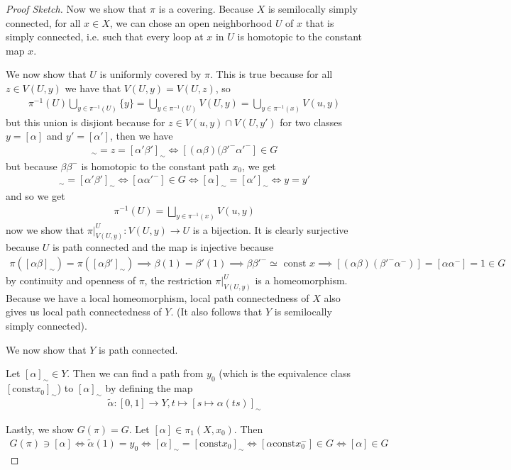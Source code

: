 \begin{proof}[Proof Sketch]
  Now we show that $\pi$ is a covering.
  Because $X$ is semilocally simply connected, for all $x \in X$, we can chose an open neighborhood $U$ of $x$ that is simply connected, i.e. such that every loop at $x$ in $U$ is homotopic to the constant map $x$.

  We now show that $U$ is uniformly covered by $\pi$.
  This is true because for all $z \in V(U,y)$ we have that $V(U,y) = V(U,z)$, so 
  \begin{align*}
    \pi^{-1}(U) \bigcup_{y \in \pi^{-1}(U)} \{y\} = \bigcup_{y \in \pi^{-1}(U)} V(U,y) = \bigcup_{y \in \pi^{-1}(x)}V(u,y)
  \end{align*}
  but this union is disjiont because for $z \in V(u,y) \cap V(U,y')$ for two classes $y = [\alpha]$ and $y' = [\alpha']$, then we have
  \begin{align*}
    [\alpha \beta]_{\sim} = z = [\alpha' \beta']_{\sim} \iff [(\alpha \beta)({\beta'}^{-}{\alpha'}^{-}] \in G
  \end{align*}
  but because $\beta \beta^{-}$ is homotopic to the constant path $x_0$, we get 
  \begin{align*}
    [\alpha \beta]_{\sim} = [\alpha' \beta']_{\sim} \iff [\alpha {\alpha'}^{-}] \in G \iff [\alpha]_{\sim} = [\alpha']_{\sim} \iff y = y'
  \end{align*}
  and so we get
  \begin{align*}
    \pi^{-1}(U) = \bigsqcup_{y \in \pi^{-1}(x)}V(u,y)
  \end{align*}
  now we show that $\pi|_{V(U,y)}^{U}: V(U,y) \to  U$ is a bijection.
  It is clearly surjective because $U$ is path connected and the map is injective because 
  \begin{align*}
    \pi([\alpha \beta]_{\sim}) = \pi([\alpha \beta']_{\sim}) \implies \beta(1) = \beta'(1) \implies \beta {\beta'}^{-} \simeq \text{ const }x \implies [(\alpha \beta)({\beta'}^{-} \alpha^{-})] = [\alpha \alpha^{-}] = 1 \in G
  \end{align*}
  by continuity and openness of $\pi$, the restriction $\pi|_{V(U,y)}^{U}$ is a homeomorphism.
  Because we have a local homeomorphism, local path connectedness of $X$ also gives us local path connectedness of $Y$. 
  (It also follows that $Y$ is semilocally simply connected).

  We now show that $Y$ is path connected.

  Let $[\alpha]_\sim \in Y$. Then we can find a path from $y_0$ (which is the equivalence class $[\text{const} x_0]_{\sim}$) to $[\alpha]_{\sim}$ by defining the map
  \begin{align*}
    \tilde{\alpha}:[0,1] \to  Y, t \mapsto  [s \mapsto  \alpha(ts)]_{\sim}
  \end{align*}

  Lastly, we show $G(\pi) = G$.
  Let $[\alpha] \in \pi_1(X,x_0)$. Then
  \begin{align*}
    G(\pi) \ni [\alpha] \iff \tilde{\alpha}(1) = y_0 \iff [\alpha]_{\sim} = [\text{const} x_0]_{\sim} \iff [\alpha \text{const} x_0^{-}] \in G \iff [\alpha] \in G
  \end{align*}
\end{proof}



